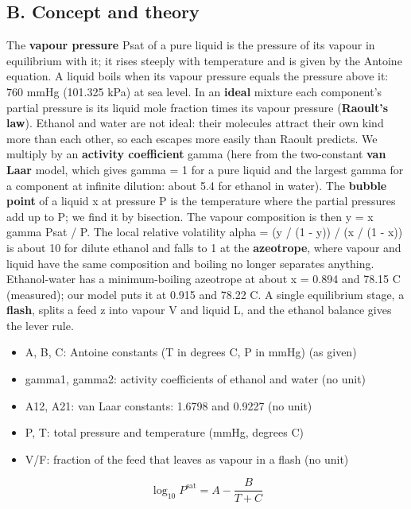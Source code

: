 \documentclass[11pt,a4paper]{article}
\begin{document}
\subsection*{B. Concept and theory}
The \textbf{vapour pressure} Psat of a pure liquid is the pressure of its vapour in equilibrium with it; it rises steeply with temperature and is given by the Antoine equation. A liquid boils when its vapour pressure equals the pressure above it: 760 mmHg (101.325 kPa) at sea level. In an \textbf{ideal} mixture each component's partial pressure is its liquid mole fraction times its vapour pressure (\textbf{Raoult's law}). Ethanol and water are not ideal: their molecules attract their own kind more than each other, so each escapes more easily than Raoult predicts. We multiply by an \textbf{activity coefficient} gamma (here from the two-constant \textbf{van Laar} model, which gives gamma = 1 for a pure liquid and the largest gamma for a component at infinite dilution: about 5.4 for ethanol in water). The \textbf{bubble point} of a liquid x at pressure P is the temperature where the partial pressures add up to P; we find it by bisection. The vapour composition is then y = x gamma Psat / P. The local relative volatility alpha = (y / (1 - y)) / (x / (1 - x)) is about 10 for dilute ethanol and falls to 1 at the \textbf{azeotrope}, where vapour and liquid have the same composition and boiling no longer separates anything. Ethanol-water has a minimum-boiling azeotrope at about x = 0.894 and 78.15 C (measured); our model puts it at 0.915 and 78.22 C. A single equilibrium stage, a \textbf{flash}, splits a feed z into vapour V and liquid L, and the ethanol balance gives the lever rule.

\begin{itemize}[nosep]
\item A, B, C: Antoine constants (T in degrees C, P in mmHg) (as given)
\item gamma1, gamma2: activity coefficients of ethanol and water (no unit)
\item A12, A21: van Laar constants: 1.6798 and 0.9227 (no unit)
\item P, T: total pressure and temperature (mmHg, degrees C)
\item V/F: fraction of the feed that leaves as vapour in a flash (no unit)
\end{itemize}

\begin{equation*}
\log_{10} P^{\mathrm{sat}} = A - \frac{B}{T + C}
\end{equation*}
\end{document}
